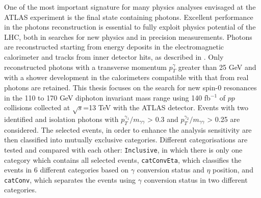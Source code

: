 \documentclass[a4paper, oneside, 11pt]{book}
\begin{document}
	One of the most important signature for many physics analyses envisaged at the ATLAS experiment is the final state containing photons. Excellent performance in the photons reconstruction is essential to fully exploit physics potential of the LHC, both in searches for new physics and in precision measurements. Photons are reconstructed starting from energy deposits in the electromagnetic calorimeter and tracks from inner detector hits, as described in \cite{Aad_2019}. Only reconstructed photons with a transverse momentum $p_T^{\gamma}$ greater than 25 GeV and with a shower development in the calorimeters compatible with that from real photons are retained. This thesis focuses on the search for new spin-0 resonances in the 110 to 170 GeV diphoton invariant mass range using 140 fb$^{-1}$ of $pp$ collisions collected at $\sqrt{s}$=13 TeV with the ATLAS detector. Events with two identified and isolation photons with $p_T^{\gamma_1}/m_{\gamma\gamma}$ > 0.3 and $p_T^{\gamma_2}/m_{\gamma\gamma}$ > 0.25 are considered. The selected events, in order to enhance the analysis sensitivity are then classified into mutually exclusive categories. Different categorisations are tested and compared with each other: \texttt{Inclusive}, in which there is only one category which contains all selected events, \texttt{catConvEta}, which classifies the events in 6 different categories based on $\gamma$ conversion status and $\eta$ position, and \texttt{catConv}, which separates the events using $\gamma$ conversion status in two different categories.
	
\end{document}
